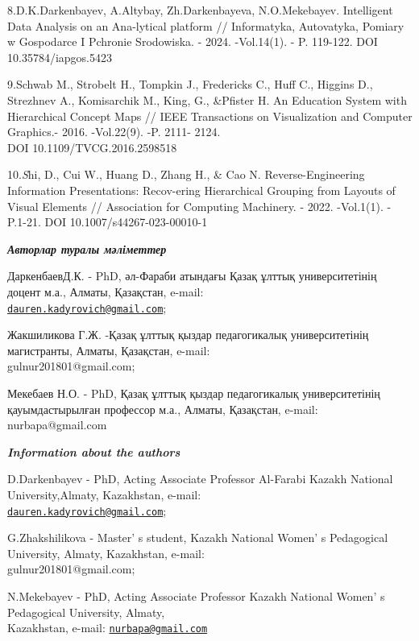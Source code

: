 \begin{references}
8.D.K.Darkenbayev, A.Altybay, Zh.Darkenbayeva, N.O.Mekebayev.
Intelligent Data Analysis on an Ana-lytical platform // Informatyka,
Autovatyka, Pomiary w Gospodarce I Pchronie Srodowiska. - 2024.
-Vol.14(1). - P. 119-122. DOI 10.35784/iapgos.5423

9.Schwab M., Strobelt H., Tompkin J., Fredericks C., Huff C., Higgins
D., Strezhnev A., Komisarchik M., King, G., \&Pfister H. An Education
System with Hierarchical Concept Maps // IEEE Transactions on
Visualization and Computer Graphics.- 2016. -Vol.22(9). -P. 2111- 2124.
\\DOI 10.1109/TVCG.2016.2598518

10.\emph{S}hi, D., Cui W., Huang D., Zhang H., \& Cao N.
Reverse-Engineering Information Presentations: Recov-ering Hierarchical
Grouping from Layouts of Visual Elements // Association for Computing
Machinery. - 2022. -Vol.1(1). - P.1-21. DOI 10.1007/s44267-023-00010-1
\end{references}

\begin{authorinfo}
\hspace{1em}\emph{{\bfseries Авторлар туралы мәліметтер}}

ДаркенбаевД.К. - PhD, әл-Фараби атындағы Қазақ ұлттық университетінің
доцент м.а., Алматы, Қазақстан, e-mail:\\
\href{mailto:dauren.kadyrovich@gmail.com}{\nolinkurl{dauren.kadyrovich@gmail.com}};

Жакшиликова Г.Ж. -Қазақ ұлттық қыздар педагогикалық университетінің
магистранты, Алматы, Қазақстан, e-mail: \\gulnur201801@gmail.com;

Мекебаев Н.О. - PhD, Қазақ ұлттық қыздар педагогикалық университетінің
қауымдастырылған профессор м.а., Алматы, Қазақстан, e-mail:
nurbapa@gmail.com

\hspace{1em}\emph{{\bfseries Information about the authors}}

D.Darkenbayev - PhD, Acting Associate Professor Al-Farabi Kazakh
National University,Almaty, Kazakhstan, e-mail:\\
\href{mailto:dauren.kadyrovich@gmail.com}{\nolinkurl{dauren.kadyrovich@gmail.com}};

G.Zhakshilikova - Master' s student, Kazakh National
Women' s Pedagogical University, Almaty,
Kazakhstan, e-mail: \\gulnur201801@gmail.com;

N.Mekebayev - PhD, Acting Associate Professor Kazakh National
Women' s Pedagogical University, Almaty,
\\Kazakhstan, e-mail: \href{mailto:nurbapa@gmail.com}{\nolinkurl{nurbapa@gmail.com}}
\end{authorinfo}
